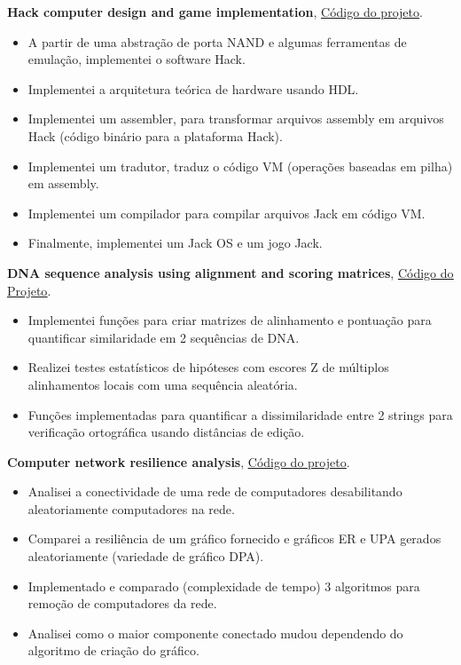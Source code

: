 \documentclass[a4paper,10pt]{article}
\newcommand{\ulink}[2]{\href{#1}{\underline{#2}}}
\begin{document}
\textbf{Hack computer design and game implementation}, \ulink{https://github.com/rokobo/From-Nand-gates-to-Tetris-implementation}{Código do projeto}.
\begin{itemize}[itemsep=0pt]
  \item A partir de uma abstração de porta NAND e algumas ferramentas de emulação, implementei o software Hack.
  \item Implementei a arquitetura teórica de hardware usando HDL.
  \item Implementei um assembler, para transformar arquivos assembly em arquivos Hack (código binário para a plataforma Hack).
  \item Implementei um tradutor, traduz o código VM (operações baseadas em pilha) em assembly.
  \item Implementei um compilador para compilar arquivos Jack em código VM.
  \item Finalmente, implementei um Jack OS e um jogo Jack.
\end{itemize}
\textbf{DNA sequence analysis using alignment and scoring matrices}, \ulink{https://github.com/rokobo/DNA-Sequence-Analysis}{Código do Projeto}.
\begin{itemize}[itemsep=0pt]
  \item Implementei funções para criar matrizes de alinhamento e pontuação para quantificar similaridade em 2 sequências de DNA.
  \item Realizei testes estatísticos de hipóteses com escores Z de múltiplos alinhamentos locais com uma sequência aleatória.
  \item Funções implementadas para quantificar a dissimilaridade entre 2 strings para verificação ortográfica usando distâncias de edição.
\end{itemize}
\textbf{Computer network resilience analysis}, \ulink{https://github.com/rokobo/Computer-Network-Resilience-Analysis}{Código do projeto}.
\begin{itemize}[itemsep=0pt]
  \item Analisei a conectividade de uma rede de computadores desabilitando aleatoriamente computadores na rede.
  \item Comparei a resiliência de um gráfico fornecido e gráficos ER e UPA gerados aleatoriamente (variedade de gráfico DPA).
  \item Implementado e comparado (complexidade de tempo) 3 algoritmos para remoção de computadores da rede.
  \item Analisei como o maior componente conectado mudou dependendo do algoritmo de criação do gráfico.
\end{itemize}
\end{document}
